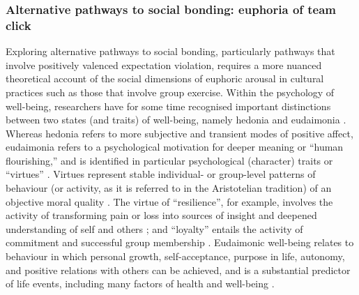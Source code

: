 \begin{CJK}{UTF8}{gbsn}



\subsubsection{Alternative pathways to social bonding: euphoria of team click}
Exploring alternative pathways to social bonding, particularly pathways that involve positively valenced expectation violation, requires a more nuanced theoretical account of the social dimensions of euphoric arousal in cultural practices such as those that involve group exercise.  Within the psychology of well-being, researchers have for some time recognised important distinctions between two states (and traits) of well-being, namely hedonia and eudaimonia \citep{Ryff1989}.  Whereas hedonia refers to more subjective and transient modes of positive affect, eudaimonia refers to a psychological motivation for deeper meaning or ``human flourishing,'' and is identified in particular psychological (character) traits or ``virtues'' \citep{Baumeister2013}.  Virtues represent stable individual- or group-level patterns of behaviour (or activity, as it is referred to in the Aristotelian tradition) of an objective moral quality \citep{Fowers2015}.
The virtue of ``resilience'', for example, involves the activity of transforming pain or loss into sources of insight and deepened understanding of self and others \citep{Ryff2015}; and ``loyalty'' entails the activity of commitment and successful group membership \citep{Fowers2015}.
Eudaimonic well-being relates to behaviour in which personal growth, self-acceptance, purpose in life, autonomy, and positive relations with others can be achieved, and is a substantial predictor of life events, including many factors of health and well-being \citep{Ryff2004,Urry2004}.


\end{CJK}
